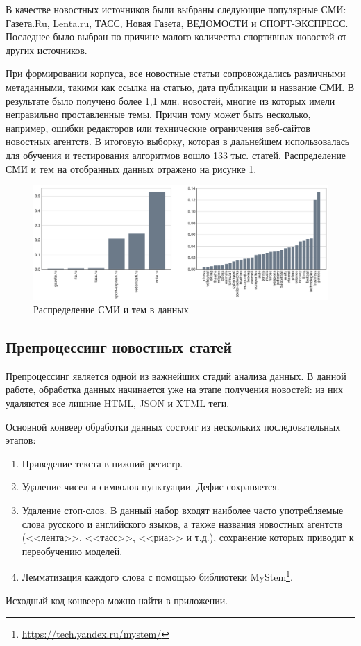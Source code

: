 \documentclass[a4paper, 14pt]{extarticle}
\begin{document}
В качестве новостных источников были выбраны следующие популярные СМИ:
Газета.Ru, Lenta.ru, ТАСС, Новая Газета, ВЕДОМОСТИ и СПОРТ-ЭКСПРЕСС. Последнее было выбран по причине малого
количества спортивных новостей от других источников.

При формировании корпуса, все новостные статьи сопровождались различными метаданными, такими как ссылка на статью,
дата публикации и название СМИ. В результате было получено более 1,1 млн. новостей, многие из которых имели
неправильно проставленные темы. Причин тому может быть несколько, например, ошибки редакторов или технические ограничения
веб-сайтов новостных агентств. В итоговую выборку, которая в дальнейшем использовалась для обучения и тестирования алгоритмов
вошло 133 тыс. статей. Распределение СМИ и тем на отобранных данных отражено на рисунке \ref{media_topic_distr}.
\begin{figure}[h!]
	\centering
	\includegraphics[width=1\textwidth]{media_topi_distr.pdf}
	\caption{Распределение СМИ и тем в данных}
	\label{media_topic_distr}
\end{figure}

\subsection{Препроцессинг новостных статей}
Препроцессинг является одной из важнейших стадий анализа данных. В данной работе, обработка данных начинается уже
на этапе получения новостей: из них удаляются все лишние HTML, JSON и XTML теги.

Основной конвеер обработки данных состоит из нескольких последовательных этапов:
\begin{enumerate}
	\item Приведение текста в нижний регистр.
	\item Удаление чисел и символов пунктуации. Дефис сохраняется.
	\item Удаление стоп-слов. В данный набор входят наиболее часто употребляемые слова русского и английского языков,
	а также названия новостных агентств (<<лента>>, <<тасс>>, <<риа>> и т.д.), сохранение которых приводит к переобучению моделей.
	\item Лемматизация каждого слова с помощью библиотеки MyStem\footnote{\url{https://tech.yandex.ru/mystem/}}.
\end{enumerate}
Исходный код конвеера можно найти в приложении. %
\end{document}
